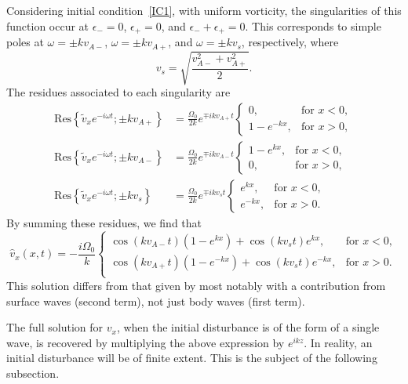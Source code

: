 \documentclass[12pt, draft]{../style-files/ociamthesis}
\begin{document}
Considering initial condition~\ref{IC1}, with uniform vorticity, the singularities of this function occur at $\epsilon_- = 0$, $\epsilon_+ = 0$, and $\epsilon_- + \epsilon_+ = 0$. This corresponds to simple poles at $\omega = \pm kv_{A-}$, $\omega = \pm kv_{A+}$, and $\omega = \pm kv_s$, respectively, where
\begin{equation}
v_s = \sqrt{\frac{v_{A-}^2 + v_{A+}^2}{2}}.
\end{equation}
The residues associated to each singularity are
\begin{align}
\mathrm{Res}\left\{\tilde{v}_x e^{-i\omega t}; \pm kv_{A+}\right\} &= \frac{\Omega_0}{2k} e^{\mp ikv_{A+}t}
\begin{cases}
0, & \text{for  } x < 0, \\
1 - e^{-kx}, & \text{for  } x > 0, 
\end{cases} \\
\mathrm{Res}\left\{\tilde{v}_x e^{-i\omega t}; \pm kv_{A-}\right\} &= \frac{\Omega_0}{2k} e^{\mp ikv_{A-}t}
\begin{cases}
1 - e^{kx}, & \text{for  } x < 0, \\
0, & \text{for  } x > 0,
\end{cases} \\
\mathrm{Res}\left\{\tilde{v}_x e^{-i\omega t}; \pm kv_{s}\right\} &= \frac{\Omega_0}{2k} e^{\mp ikv_st} 
\begin{cases}
e^{kx}, & \text{for  } x < 0, \\
e^{-kx}, & \text{for  } x > 0.
\end{cases}
\end{align}
By summing these residues, we find that
\begin{equation}
\hat{v}_x(x, t) = -\frac{i\Omega_0}{k} \begin{cases}
\cos(kv_{A-}t)\left(1-e^{kx}\right) + \cos(kv_st)e^{kx}, & \text{for  } x<0, \\
\cos(kv_{A+}t)\left(1-e^{-kx}\right) + \cos(kv_st)e^{-kx}, & \text{for  } x>0. \\
\end{cases}
\label{sol int}
\end{equation}
This solution differs from that given by \cite{rae_etal81} most notably with a contribution from surface waves (second term), not just body waves (first term).

The full solution for $v_x$, when the initial disturbance is of the form of a single wave, is recovered by multiplying the above expression by $e^{ikz}$. In reality, an initial disturbance will be of finite extent. This is the subject of the following subsection.
\end{document}
